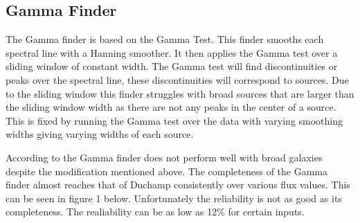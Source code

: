 \documentclass[prodmode,acmtecs]{acmsmall} \usepackage[ruled]{algorithm2e}
\begin{document}
\subsection{Gamma Finder}
The Gamma finder is based on the Gamma Test. This finder smooths each spectral line with a Hanning
smoother. It then applies the Gamma test over a sliding window of constant width. The Gamma test will
find discontinuities or peaks over the spectral line, these discontinuities will correspond to sources. 
Due to the sliding window this finder struggles with broad sources that are larger
than the sliding window width as there are not any peaks in the center of a source. This is fixed by
running the Gamma test over the data with varying smoothing widths giving varying widths of each source.
\cite{boyce2003gammafinder}

According to \cite{popping2012comparison} the Gamma finder does not perform well with broad galaxies
despite the modification mentioned above. The completeness of the Gamma finder almost reaches that of Duchamp consistently over various flux values. 
This can be seen in figure 1 below. Unfortunately the reliability is not as good as its completeness. 
The realiability can be as low as 12\% for certain inputs. 
\end{document}
